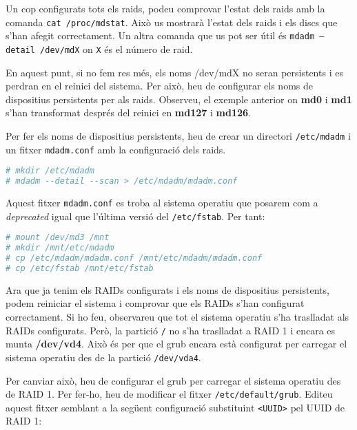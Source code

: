 Un cop configurats tots els raids, podeu comprovar l'estat dels raids amb la comanda \texttt{cat /proc/mdstat}. Això us mostrarà l'estat dels raids i els discs que s'han afegit correctament. Un altra comanda que us pot ser útil és \texttt{mdadm --detail /dev/mdX} on \texttt{X} és el número de raid. 

\begin{warning}
En aquest punt, si no fem res més, els noms /dev/mdX no seran persistents i es perdran en el reinici del sistema. Per això, heu de configurar els noms de dispositius persistents per als raids. Observeu, el exemple anterior on \textbf{md0} i \textbf{md1} s'han transformat després del reinici en \textbf{md127} i \textbf{md126}.
\end{warning}

Per fer els noms de dispositius persistents, heu de crear un directori \texttt{/etc/mdadm} i un fitxer \texttt{mdadm.conf} amb la configuració dels raids. 

\begin{lstlisting}[language=bash, numbers=none, commentstyle=\color{black}]
# mkdir /etc/mdadm
# mdadm --detail --scan > /etc/mdadm/mdadm.conf
\end{lstlisting}

\begin{warning}
Aquest fitxer \texttt{mdadm.conf} es troba al sistema operatiu que posarem com a \textit{deprecated} igual que l'última versió del \texttt{/etc/fstab}. Per tant:
\begin{lstlisting}[language=bash, numbers=none, commentstyle=\color{black}]
# mount /dev/md3 /mnt
# mkdir /mnt/etc/mdadm
# cp /etc/mdadm/mdadm.conf /mnt/etc/mdadm/mdadm.conf
# cp /etc/fstab /mnt/etc/fstab
\end{lstlisting}
\end{warning}

Ara que ja tenim els RAIDs configurats i els noms de dispositius persistents, podem reiniciar el sistema i comprovar que els RAIDs s'han configurat correctament. Si ho feu, observareu que tot el sistema operatiu s'ha traslladat als RAIDs configurats. Però, la partició \texttt{/} no s'ha traslladat a RAID 1 i encara es munta \textbf{/dev/vd4}. Això és per que el grub encara està configurat per carregar el sistema operatiu des de la partició \texttt{/dev/vda4}. 

Per canviar això, heu de configurar el grub per carregar el sistema operatiu des de RAID 1. Per fer-ho, heu de modificar el fitxer \texttt{/etc/default/grub}. Editeu aquest fitxer semblant a la següent configuració substituint \texttt{<UUID>} pel UUID de RAID 1:

